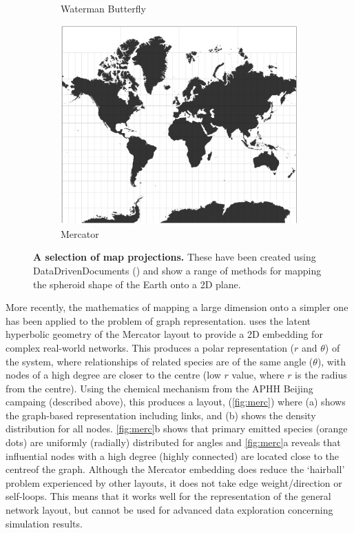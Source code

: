 \begin{figure}[H]
\begin{subfigure}[b]{.3\textwidth}
     \caption{Waterman Butterfly}
     \end{subfigure}
     \begin{subfigure}[b]{.3\textwidth}
         \centering
     \includegraphics[width=\textwidth]{figures_c1/layout/mercator.png}
     \caption{Mercator}
     \end{subfigure}
        \caption{\textbf{A selection of map projections.} These have been created using DataDrivenDocuments (\citep{d3}) and show a range of methods for mapping the spheroid shape of the Earth onto a 2D plane. }
      \label{fig:projections}
\end{figure}

More recently, the mathematics of mapping a large dimension onto a simpler one has been applied to the problem of graph representation. \citep{mercgraph} uses the latent hyperbolic geometry of the Mercator layout to provide a 2D embedding for complex real-world networks. This produces a polar representation ($r$ and $\theta$) of the system, where relationships of related species are of the same angle ($\theta$), with nodes of a high degree are closer to the centre (low $r$ value, where $r$ is the radius from the centre). Using the chemical mechanism from the APHH  Beijing campaing (described above), this produces a layout, (\autoref{fig:merc}) where (a) shows the graph-based representation including links, and (b) shows the density distribution for all nodes. \autoref{fig:merc}b shows that primary emitted species (orange dots) are uniformly (radially) distributed for angles and \autoref{fig:merc}a reveals that influential nodes with a high degree (highly connected) are located close to the centreof the graph. Although the Mercator embedding does reduce the `hairball' problem experienced by other layouts, it does not take edge weight/direction or self-loops. This means that it works well for the representation of the general network layout, but cannot be used for advanced data exploration concerning simulation results.  


